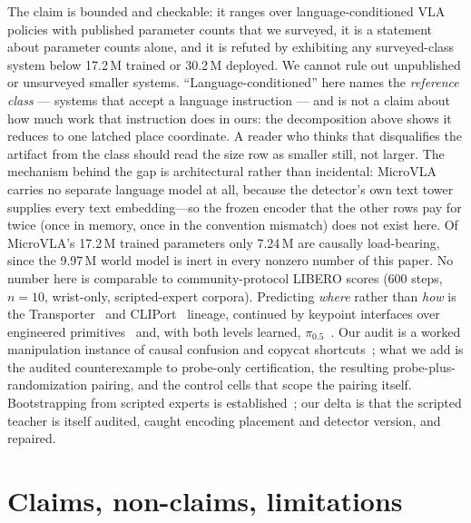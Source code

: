 \documentclass[10pt,twocolumn,letterpaper]{article}
\begin{document}
The claim is bounded and checkable: it ranges over language-conditioned VLA
policies with published parameter counts that we surveyed, it is a statement
about parameter counts alone, and it is refuted by exhibiting any surveyed-class
system below 17.2\,M trained or 30.2\,M deployed. We cannot rule out
unpublished or unsurveyed smaller systems. ``Language-conditioned'' here names
the \emph{reference class} --- systems that accept a language instruction ---
and is not a claim about how much work that instruction does in ours: the
decomposition above shows it reduces to one latched place coordinate. A reader
who thinks that disqualifies the artifact from the class should read the size
row as smaller still, not larger. The mechanism behind the gap is
architectural rather than incidental: MicroVLA carries no separate language
model at all, because the detector's own text tower supplies every text
embedding---so the frozen encoder that the other rows pay for twice (once in
memory, once in the convention mismatch) does not exist here. Of MicroVLA's
17.2\,M trained parameters only 7.24\,M are causally load-bearing, since the
9.97\,M world model is inert in every nonzero number of this paper.
No number here is comparable to
community-protocol LIBERO scores (600 steps, $n{=}10$, wrist-only,
scripted-expert corpora). Predicting \emph{where} rather than \emph{how} is
the Transporter~\citep{zeng2020transporter} and CLIPort~\citep{shridhar2021cliport}
lineage, continued by keypoint interfaces over engineered
primitives~\citep{liu2024moka,huang2023voxposer} and, with both levels
learned, $\pi_{0.5}$~\citep{black2025pi05}. Our audit is a worked manipulation
instance of causal confusion and copycat
shortcuts~\citep{dehaan2019causal,wen2020copycat,bansal2018chauffeurnet};
what we add is the audited counterexample to probe-only certification, the
resulting probe-plus-randomization pairing, and the control cells that scope
the pairing itself. Bootstrapping from scripted experts is
established~\citep{mandlekar2023mimicgen}; our delta is that the scripted
teacher is itself audited, caught encoding placement and detector version, and
repaired.

\section{Claims, non-claims, limitations}
\end{document}
